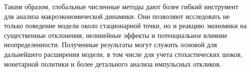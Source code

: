 Таким образом, глобальные численные методы дают более гибкий инструмент для анализа макроэкономической динамики. Они позволяют исследовать не только поведение модели около стационарной точки, но и реакцию экономики на существенные отклонения, нелинейные эффекты и потенциальное влияние неопределенности. Полученные результаты могут служить основой для дальнейшего расширения модели, в том числе для учета стохастических шоков, монетарной политики и более детального анализа импульсных откликов.

